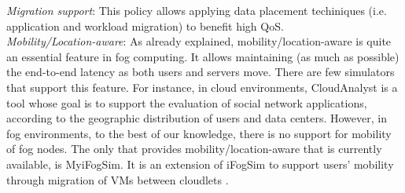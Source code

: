 \textit{Migration support}: This policy allows applying data placement techiniques (i.e. application and workload migration) to benefit high QoS.\\[6pt]
\textit{Mobility/Location-aware}: As already explained, mobility/location-aware is quite an essential feature in fog computing. It allows maintaining (as much as possible) the end-to-end latency as both users and servers move. There are few simulators that support this feature. For instance, in cloud environments, CloudAnalyst \cite{wickremasinghe2010cloudanalyst} is a tool whose goal is to support the evaluation of social network applications, according to the geographic distribution of users and data centers. However, in fog environments, to the best of our knowledge, there is no support for mobility of fog nodes. The only that provides mobility/location-aware that is currently available, is MyiFogSim. It is an extension of iFogSim to support users' mobility through migration of VMs between cloudlets \cite{lopes2017myifogsim}.
